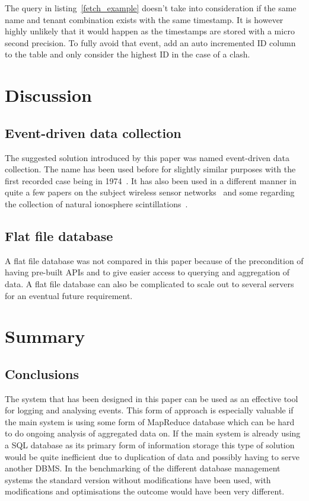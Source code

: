 \documentclass[a4paper,12pt]{article}
\begin{document}
The query in listing~\ref{fetch_example} doesn't take into consideration if the same name and tenant combination exists with the same timestamp. 
It is however highly unlikely that it would happen as the timestamps are stored with a micro second precision. 
To fully avoid that event, add an auto incremented ID column to the table and only consider the highest ID in the case of a clash.

\newpage
\section{Discussion}
\subsection{Event-driven data collection}
The suggested solution introduced by this paper was named event-driven data collection. The name has been used before for slightly similar purposes with the first recorded case 
being in 1974~\cite{EVENTDRIVEN}. It has also been used in a different manner in quite a few papers on the subject wireless sensor networks~\cite{EVENTDRIVEN2} and some regarding the collection of natural 
ionosphere scintillations~\cite{EVENTDRIVEN3}.

\subsection{Flat file database}
A flat file database was not compared in this paper because of the precondition of having pre-built APIs and to give easier access to querying and aggregation of data. A flat file database can also be complicated to scale out 
to several servers for an eventual future requirement. 

\newpage
{}
\section{Summary}
\subsection{Conclusions}
The system that has been designed in this paper can be used as an effective tool for logging and analysing events. This form of approach is especially valuable if the main system is using some form of MapReduce 
database which can be hard to do ongoing analysis of aggregated data on. If the main system is already using a SQL database as its primary form of information storage this type of solution would be quite inefficient 
due to duplication of data and possibly having to serve another DBMS\@. In the benchmarking of the different database management systems the standard version without modifications have been used, with modifications 
and optimisations the outcome would have been very different. 
\end{document}
